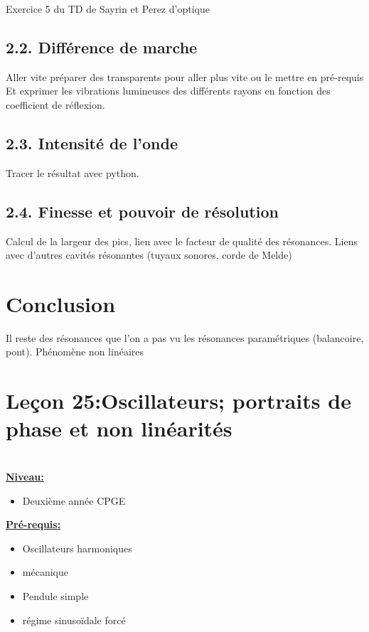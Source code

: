 \documentclass[french, a4paper, 10pt, twocolumn, landscape]{article}
\begin{document}
Exercice 5 du TD de Sayrin et Perez d'optique

\subsection*{2.2. Différence de marche}

Aller vite préparer des transparents pour aller plus vite ou le mettre en pré-requis
Et exprimer les vibrations lumineuses des différents rayons en fonction des coefficient de réflexion.

\subsection*{2.3. Intensité de l'onde}

Tracer le résultat avec python. 

\subsection*{2.4. Finesse et pouvoir de résolution}

Calcul de la largeur des pics, lien avec le facteur de qualité des résonances. 
Liens avec d'autres cavités résonantes (tuyaux sonores, corde de Melde)

\section*{Conclusion}

Il reste des résonances que l'on a pas vu les résonances paramétriques (balancoire, pont).  Phénomène non linéaires

\clearpage 

\section*{Leçon 25:Oscillateurs; portraits de phase et non linéarités}

\hrulefill\\

\noindent\underline{\textbf{Niveau:}} 
\begin{itemize}
    \item Deuxième année CPGE
\end{itemize}

\noindent\underline{\textbf{Pré-requis:}}
\begin{itemize}
    \item Oscillateurs harmoniques
    \item mécanique
    \item Pendule simple
    \item régime sinusoïdale forcé
\end{itemize}
\end{document}
